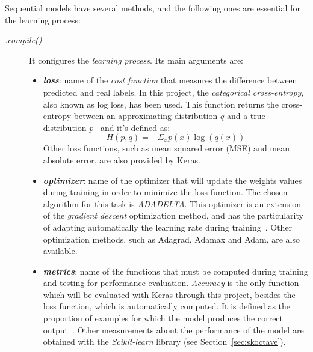 Sequential models have several methods, and the following ones are essential for the learning process:
\begin{description}
	\item[\textit{.compile()}] It configures the \emph{learning process}. Its main arguments are:
	\begin{itemize}
		\item \textbf{\textit{loss}}: name of the \emph{cost function} that measures the difference between predicted and real labels. In this project, the \emph{categorical cross-entropy}, also known as log loss, has been used. This function returns the cross-entropy between an approximating distribution $q$ and a true distribution $p$~\cite{theano} and it's defined as:
		\begin{equation}\label{eq:categorical_crossentropy}
		H(p,q)=-\Sigma_{x}p(x)\log(q(x))
		\end{equation}		
		Other loss functions, such as mean squared error (MSE) and mean absolute error, are also provided by Keras.
		
		\item \textbf{\textit{optimizer}}: name of the optimizer that will update the weights values during training in order to minimize the loss function. The chosen algorithm for this task is \emph{ADADELTA}. This optimizer is an extension of the \emph{gradient descent} optimization method, and has the particularity of adapting automatically the learning rate during training~\cite{DBLP:journals/corr/abs-1212-5701}.				
		Other optimization methods, such as Adagrad, Adamax and Adam, are also available.
		
		\item \textbf{\textit{metrics}}: name of the functions that must be computed during training and testing for performance evaluation. \emph{Accuracy} is the only function which will be evaluated with Keras through this project, besides the loss function, which is automatically computed. It is defined as the proportion of examples for which the model produces the correct output~\cite{Goodfellow-et-al-2016}.			
		Other measurements about the performance of the model are obtained with the \emph{Scikit-learn} library (see Section~\ref{sec:skoctave}).
	\end{itemize}
\end{description}

